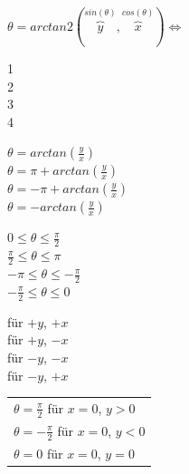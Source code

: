 	\begin{minipage}{5cm}
    	\vspace{9mm}
    	$\theta=arctan2(\overbrace{y}^{sin(\theta)},\overbrace{x}^{cos(\theta)}) \Leftrightarrow$
    \end{minipage}
	\begin{minipage}[t]{0.8cm}
    	\textcircled{1}\\
    	\textcircled{2}\\
    	\textcircled{3}\\
    	\textcircled{4}
    \end{minipage}
	\begin{minipage}[t]{3.5cm}
    	$\theta= arctan(\frac{y}{x})$\\
    	$\theta= \pi + arctan(\frac{y}{x})$\\
    	$\theta= -\pi + arctan(\frac{y}{x})$\\
    	$\theta= -arctan(\frac{y}{x})$\\
    \end{minipage}
	\begin{minipage}[t]{2.5cm}
    	\hspace{2mm} $0 \leq \theta \leq \frac{\pi}{2}$\\
    	\hspace*{1.5mm} $\frac{\pi}{2} \leq \theta \leq \pi$\\
    	$-\pi \leq \theta \leq -\frac{\pi}{2}$\\
    	$-\frac{\pi}{2} \leq \theta \leq 0$
    \end{minipage}
	\begin{minipage}[t]{2.5cm}
    	für $+y$, $+x$\\
    	für $+y$, $-x$\\
    	für $-y$, $-x$\\
    	für $-y$, $+x$
    \end{minipage}
	\begin{minipage}[t]{4cm}
     	\begin{tabular}[t]{|l}
    	$\theta = \frac{\pi}{2}$ für $x=0$, $y>0$\\
    	$\theta = - \frac{\pi}{2}$ für $x=0$, $y<0$\\
    	$\theta = 0$ für $x=0$, $y=0$\\
    	\end{tabular}
    \end{minipage}


\clearpage

